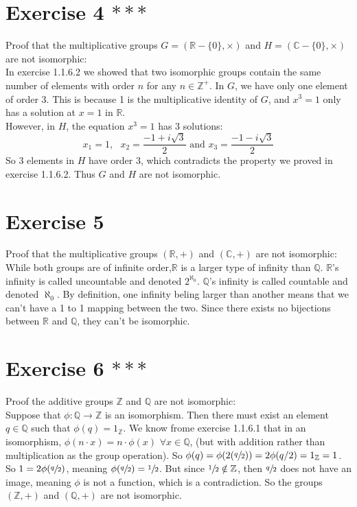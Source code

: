 \documentclass{article}
\newcommand{\Z}{\mathbb{Z}}
\newcommand{\Q}{\mathbb{Q}}
\newcommand{\R}{\mathbb{R}}
\newcommand{\C}{\mathbb{C}}
\begin{document}
    \section*{Exercise 4 $***$}
    Proof that the multiplicative groups $G = (\R - \{0\}, \times)$
    and $H = (\C - \{0\}, \times)$ are not isomorphic: \\
    In exercise 1.1.6.2 we showed that two isomorphic groups contain the same
    number of elements with order $n$ for any $n \in \Z^+$.
    In $G$, we have only one element of order 3.
    This is because 1 is the multiplicative identity of $G$,
    and $x^3 = 1$ only has a solution at $x = 1$ in $\R$. \\
    However, in $H$, the equation $x^3 = 1$ has 3 solutions:
    \[x_1 = 1, \text{ } x_2 = \dfrac{-1 + i\sqrt{3}}{2}
    \text{ and } x_3 = \dfrac{-1 - i\sqrt{3}}{2}\]
    So 3 elements in $H$ have order 3,
    which contradicts the property we proved in exercise 1.1.6.2.
    Thus $G$ and $H$ are not isomorphic. 
    

    \section*{Exercise 5}
    Proof that the multiplicative groups $(\R, +)$
    and $(\C, +)$ are not isomorphic: \\
    While both groups are of infinite order,$
    \R$ is a larger type of infinity than $\Q$.
    $\R$'s infinity is called uncountable and denoted $2^{\aleph_0}$.
    $\Q$'s infinity is called countable and denoted $\aleph_0$.
    By definition, one infinity beling larger than another means that
    we can't have a 1 to 1 mapping between the two.
    Since there exists no bijections between $\R$ and $\Q$,
    they can't be isomorphic.


    \section*{Exercise 6 $***$}
    Proof the additive groups $\Z$ and $\Q$ are not isomorphic: \\
    Suppose that $\phi: \Q \to \Z$ is an isomorphism.
    Then there must exist an element $q \in \Q$
    such that $\phi(q) = 1_\Z$.
    We know frome exercise 1.1.6.1 that in an isomorphism,
    $\phi(n \cdot x) = n \cdot \phi(x)$ $\forall x \in \Q$,
    (but with addition rather than multiplication as the group operation).
    So $\phi(q) = \phi(2(\sfrac{q}{2})) = 2\phi(q/2) = 1_\Z = 1$.
    So $1 = 2\phi(\sfrac{q}{2})$, meaning $\phi(\sfrac{q}{2}) = \sfrac{1}{2}$.
    But since $\sfrac{1}{2} \notin \Z$,
    then $\sfrac{q}{2}$ does not have an image,
    meaning $\phi$ is not a function, which is a contradiction.
    So the groups $(\Z, +)$ and $(\Q, +)$ are not isomorphic.
\end{document}
